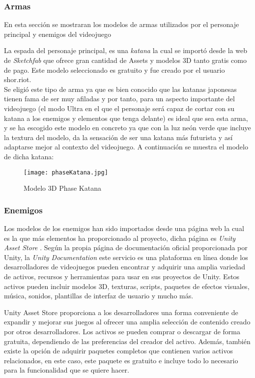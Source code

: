 \subsubsection{Armas}
En esta sección se mostraran los modelos de armas utilizados por el personaje principal y enemigos del videojuego

La espada del personaje principal, es una \textit{katana} la cual se importó desde la web de 
\textit{Sketchfab} \cite{Sketchfab} que ofrece gran cantidad de Assets y modelos 3D tanto gratis como de pago.
Este modelo seleccionado es gratuito y fue creado por el usuario shor.riot. \\

Se eligió este tipo de arma ya que es bien conocido
que las katanas japonesas tienen fama de ser muy afiladas y por tanto, para un aspecto importante del videojuego 
(el modo Ultra en el que el personaje será capaz de cortar con su katana a los enemigos y elementos que tenga delante) es ideal que sea esta arma, y se
ha escogido este modelo en concreto ya que con la luz neón verde que incluye la textura del modelo,
da la sensación de ser una katana más futurista y así adaptarse mejor al contexto del videojuego. A continuación se muestra el modelo
de dicha katana: 

\begin{figure}[H]
    \centering
    \texttt{[image: phaseKatana.jpg]}
    \caption{Modelo 3D Phase Katana}
\end{figure}

\subsubsection{Enemigos}

Los modelos de los enemigos han sido importados desde una página web la cual es la que más elementos ha proporcionado al proyecto, dicha página es \textit{Unity Asset Store} \cite{UnityAssetStore}. Según la propia página de documentación oficial proporcionada por Unity, la \textit{Unity Documentation} \cite{UnityDocumentation} este servicio es una plataforma en línea donde los desarrolladores de videojuegos pueden encontrar y adquirir una amplia variedad de activos, recursos y herramientas para usar en sus proyectos de Unity. Estos activos pueden incluir modelos 3D, texturas, scripts, paquetes de efectos visuales, música, sonidos, plantillas de interfaz de usuario y mucho más.

Unity Asset Store proporciona a los desarrolladores una forma conveniente de expandir y mejorar sus juegos al ofrecer una amplia selección de contenido creado por otros desarrolladores. Los activos se pueden comprar o descargar de forma gratuita, dependiendo de las preferencias del creador del activo. Además, también existe la opción de adquirir paquetes completos que contienen varios activos relacionados, en este caso, este paquete es gratuito e incluye todo lo necesario para la funcionalidad que se quiere hacer.

